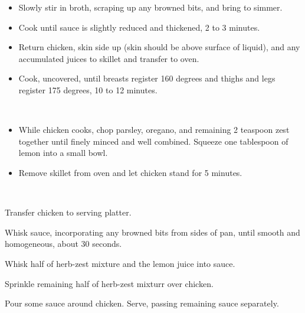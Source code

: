 \documentclass[11pt,letterpaper]{article}
\begin{document}
\begin{description}
\begin{description}
\begin{itemize}
			\item Slowly stir in broth, scraping up any browned bits, and bring to simmer. 
			\item Cook until sauce is slightly reduced and thickened, 2 to 3 minutes. 
			\item Return chicken, skin side up (skin should be above surface of liquid), and any accumulated juices to skillet and transfer to oven. 
			\item Cook, uncovered, until breasts register 160 degrees and thighs and legs register 175 degrees, 10 to 12 minutes.		\end{itemize}
	\item[Prepping finishing flavours]\ \\
		\begin{itemize}
			\item	While chicken cooks, chop parsley, oregano, and remaining 2 teaspoon zest together until finely minced and well combined. Squeeze one tablespoon of lemon into a small bowl. 
			\item Remove skillet from oven and let chicken stand for 5 minutes.
		\end{itemize}	
	\item[Finishing Base and Serving]\ \\
		\item Transfer chicken to serving platter. 
		\item Whisk sauce, incorporating any browned bits from sides of pan, until smooth and homogeneous, about 30 seconds. 
		\item Whisk half of herb-zest mixture and the lemon juice into sauce.
		\item Sprinkle remaining half of  herb-zest mixturr over chicken. 
		\item Pour some sauce around chicken. Serve, passing remaining sauce separately.
	\end{description}
\end{description}
\end{document}
